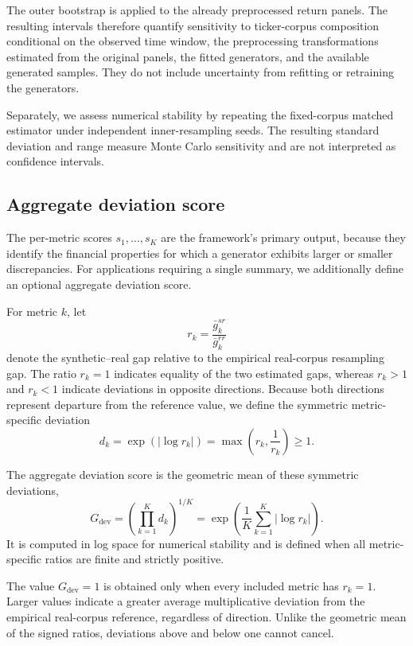 The outer bootstrap is applied to the already preprocessed return panels. The resulting intervals therefore quantify sensitivity to ticker-corpus composition conditional on the observed time window, the preprocessing transformations estimated from the original panels, the fitted generators, and the available generated samples. They do not include uncertainty from refitting or retraining the generators.

Separately, we assess numerical stability by repeating the fixed-corpus matched estimator under independent inner-resampling seeds. The resulting standard deviation and range measure Monte Carlo sensitivity and are not interpreted as confidence intervals.

\subsection{Aggregate deviation score}\label{sec:method_aggregate}

The per-metric scores $s_1,\ldots,s_K$ are the framework's primary output,
because they identify the financial properties for which a generator exhibits
larger or smaller discrepancies.
For applications requiring a single summary, we additionally define an
optional aggregate deviation score.

For metric $k$, let
\[
    r_k = \frac{\bar g_k^{sr}}{\bar g_k^{rr}}
\]
denote the synthetic--real gap relative to the empirical real-corpus
resampling gap.
The ratio $r_k=1$ indicates equality of the two estimated gaps, whereas
$r_k>1$ and $r_k<1$ indicate deviations in opposite directions.
Because both directions represent departure from the reference value, we
define the symmetric metric-specific deviation
\[
    d_k
    =
    \exp\!\left(\left|\log r_k\right|\right)
    =
    \max\left(r_k,\frac{1}{r_k}\right)
    \geq 1.
\]

The aggregate deviation score is the geometric mean of these symmetric
deviations,
\[
    G_{\mathrm{dev}}
    =
    \left(\prod_{k=1}^{K}d_k\right)^{1/K}
    =
    \exp\!\left(
        \frac{1}{K}\sum_{k=1}^{K}\left|\log r_k\right|
    \right).
\]
It is computed in log space for numerical stability and is defined when all
metric-specific ratios are finite and strictly positive.

The value $G_{\mathrm{dev}}=1$ is obtained only when every included
metric has $r_k=1$.
Larger values indicate a greater average multiplicative deviation from the
empirical real-corpus reference, regardless of direction.
Unlike the geometric mean of the signed ratios, deviations above and below
one cannot cancel.

